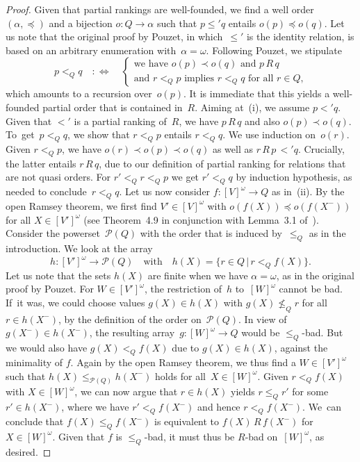 \documentclass{amsart}
\numberwithin{theorem}{section}
\theoremstyle{definition}
\begin{document}
\begin{proof}
Given that partial rankings are well-founded, we find a well order~$(\alpha,\preceq)$ and a bijection $o:Q\to\alpha$ such that $p\leq'q$ entails $o(p)\preceq o(q)$. Let us note that the original proof by Pouzet, in which~$\leq'$ is the identity relation, is based on an arbitrary enumeration with~$\alpha=\omega$. Following Pouzet, we stipulate
\begin{equation*}
p<_Qq\quad:\Leftrightarrow\quad\begin{cases}
\text{we have $o(p)\prec o(q)$ and $p\,R\,q$}\\
\text{and $r<_Q p$ implies $r<_Q q$ for all $r\in Q$,}
\end{cases}
\end{equation*}
which amounts to a recursion over~$o(p)$. It is immediate that this yields a well-founded partial order that is contained in~$R$. Aiming at~(i), we assume $p<'q$. Given that $<'$ is a partial ranking of~$R$, we have $p\,R\,q$ and also $o(p)\prec o(q)$. To~get~$p<_Q q$, we show that $r<_Q p$ entails $r<_Q q$. We use induction on~$o(r)$. Given $r<_Q p$, we have $o(r)\prec o(p)\prec o(q)$ as well as $r\, R\,p\,<'q$. Crucially, the latter entails $r\,R\,q$, due to our definition of partial ranking for relations that are not quasi orders. For $r'<_Q r<_Q p$ we get $r'<_Q q$ by induction hypothesis, as needed to conclude~$r<_Q q$. Let us now consider $f:[V]^\omega\to Q$ as in~(ii). By the open Ramsey theorem, we first find $V'\in[V]^\omega$ with $o(f(X))\preceq o(f(X^-))$ for all $X\in[V']^\omega$ (see Theorem~4.9 in conjunction with Lemma~3.1 of~\cite{marcone-survey-old}). Consider the power\-set~$\mathcal P(Q)$ with the order that is induced by~$\leq_Q$ as in the introduction. We look at the array
\begin{equation*}
h:[V']^\omega\to\mathcal P(Q)\quad\text{with}\quad h(X)=\{r\in Q\,|\,r<_Q f(X)\}.
\end{equation*}
Let us note that the sets $h(X)$ are finite when we have $\alpha=\omega$, as in the original proof by Pouzet. For $W\in[V']^\omega$, the restriction of~$h$ to~$[W]^\omega$ cannot be bad. If~it was, we could choose values $g(X)\in h(X)$ with $g(X)\not\leq_Q r$ for all~$r\in h(X^-)$, by the definition of the order on~$\mathcal P(Q)$. In view of $g(X^-)\in h(X^-)$, the resulting array~$g:[W]^\omega\to Q$ would be $\leq_Q$-bad. But we would also have $g(X)<_Q f(X)$ due to $g(X)\in h(X)$, against the minimality of $f$. Again by the open Ramsey theorem, we thus find a $W\in[V']^\omega$ such that $h(X)\leq_{\mathcal P(Q)} h(X^-)$ holds for all~$X\in[W]^\omega$. Given $r<_Q f(X)$ with $X\in[W]^\omega$, we can now argue that $r\in h(X)$ yields $r\leq_Q r'$ for some $r'\in h(X^-)$, where we have $r'<_Q f(X^-)$ and hence $r<_Q f(X^-)$. We~can conclude that $f(X)\leq_Q f(X^-)$ is equivalent to $f(X)\,R\,f(X^-)$ for~$X\in[W]^\omega$. Given that $f$ is $\leq_Q$-bad, it must thus be $R$-bad on~$[W]^\omega$, as desired.
\end{proof}
\end{document}
